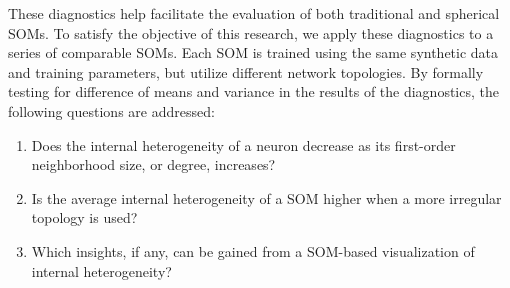 These diagnostics help facilitate the evaluation of both traditional and
spherical SOMs. To satisfy the objective of this research, we apply these
diagnostics to a series of comparable SOMs. Each SOM is trained using the
same synthetic data and training parameters, but utilize different network
topologies. By formally testing for difference of means and variance in the
results of the diagnostics, the following questions are addressed:

\begin{enumerate}
\item Does the internal heterogeneity of a neuron decrease as its first-order neighborhood size, or degree, increases?
\item Is the average internal heterogeneity of a SOM higher when a more irregular topology is used?
\item Which insights, if any, can be gained from a SOM-based visualization of internal heterogeneity?
\end{enumerate}


